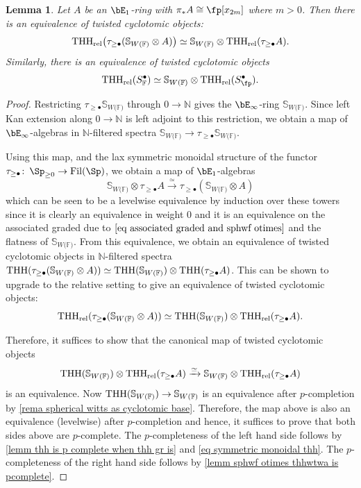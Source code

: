 \documentclass[english,10pt]{amsart}
\newcommand{\sphwf}{\mathbb{S}_{W(\mathbb{F)}}}
\newcommand{\rel}{\textup{rel}}
\newcommand{\field}{\mathbb{F}}
\newtheorem{lemm}{Lemma}[section]
\theoremstyle{definition}
\numberwithin{equation}{section}
\DeclareMathOperator{\thh}{\ensuremath{\textup{THH}}}
\newcommand{\rthh}{\mathrm{THH}_{\rel}}
\newcommand{\Fil}{\mathrm{Fil}}
\newcommand{\N}{\mathbb{N}}
\newcommand{\wtw}{\tau_{\geq \bullet}}
\newcommand{\pis}{\pi_*}
\def\co{\colon\thinspace}
\begin{document}
\begin{lemm}\label{lemm twisted cyclotomic moving witt out}
Let $A$ be an $\bE_1$-ring with $\pis A \cong \fp[x_{2m}]$ where $m>0$. Then there is an equivalence of twisted cyclotomic objects:
\[\rthh\big(\tau_{\geq \bullet}(\sphwf \otimes A)\big) \simeq \sphwf \otimes \rthh(\tau_{\geq \bullet }A).\]
Similarly, there is an equivalence of twisted cyclotomic objects 
\[\rthh(S_{\field}^{\bullet}) \simeq \sphwf \otimes \rthh(S_{\fp}^\bullet).\]
\end{lemm}
\begin{proof}
Restricting $\tau_{\geq \bullet}\sphwf$ through $0 \to \N$ gives the $\bE_\infty$-ring $\sphwf$. Since left Kan extension along $0\to \N$ is left adjoint to this restriction, we obtain a map of $\bE_\infty$-algebras in $\N$-filtered spectra $\sphwf \to \tau_{\geq \bullet} \sphwf$.

Using this map, and the lax symmetric monoidal structure of the functor  $\tau_{\geq \bullet}\co \Sp_{\geq 0} \to\Fil(\Sp)$, we obtain a map of $\bE_1$-algebras 
\begin{equation}\label{eq intermediate 10}
\sphwf  \otimes \tau_{\geq \bullet} A\xrightarrow{\simeq} \tau_{\geq \bullet }(\sphwf \otimes A)
\end{equation}
which can be seen to be a levelwise equivalence by induction over these towers since it is clearly an equivalence in weight $0$ and it is an equivalence on the associated graded due to $\eqref{eq associated graded and sphwf otimes}$ and the flatness of $\sphwf$. From this equivalence, we obtain an equivalence of twisted cyclotomic objects in $\N$-filtered spectra $\thh(\tau_{\geq \bullet}(\sphwf \otimes A)) \simeq \thh(\sphwf) \otimes \thh(\wtw A)$. This can be shown to upgrade to the relative setting to give an equivalence of twisted cyclotomic objects:
\begin{equation}\label{eq symmetric monoidal thh}
\rthh(\tau_{\geq \bullet}(\sphwf \otimes A)) \simeq \thh(\sphwf) \otimes \rthh(\wtw A).
\end{equation}

Therefore, it suffices to show that the canonical map of twisted cyclotomic objects 
\[\thh(\sphwf) \otimes \rthh(\wtw A) \xrightarrow{\simeq} \sphwf \otimes \rthh(\wtw A)\]
is an equivalence. Now $\thh(\sphwf) \to \sphwf$ is an equivalence after $p$-completion by  \autoref{rema spherical witts as cyclotomic base}. Therefore, the map above is also an equivalence (levelwise) after $p$-completion and hence, it suffices to prove that both sides above are $p$-complete. The $p$-completeness of the left hand side follows by \autoref{lemm thh is p complete when thh gr is} and \eqref{eq symmetric monoidal thh}. The $p$-completeness of the right hand side follows by \autoref{lemm sphwf otimes thhwtwa is pcomplete}. 


\end{proof}
\end{document}
